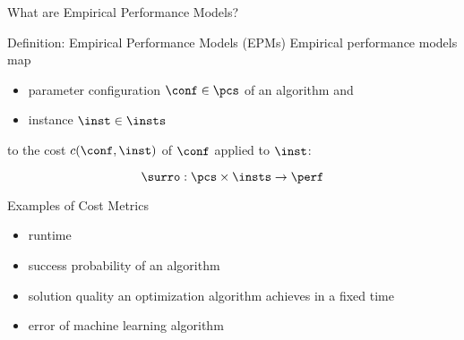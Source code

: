 \begin{frame}[c]{What are Empirical Performance Models?}

\begin{block}{Definition: Empirical Performance Models (EPMs)}
Empirical performance models map
\begin{itemize} 
  \item parameter configuration $\conf \in \pcs$ of an algorithm and 
  \item instance $\inst \in \insts$
\end{itemize}
to the cost $c(\conf,\inst)$ of $\conf$ applied to $\inst$:

\begin{equation}
\surro: \pcs \times \insts \to \perf \nonumber
\end{equation}
\end{block}

\pause
\begin{block}{Examples of Cost Metrics}
\begin{itemize}
  \item runtime
  \item success probability of an algorithm
  \item solution quality an optimization algorithm achieves in a fixed time
  \item error of machine learning algorithm
\end{itemize}
\end{block}

\end{frame}
